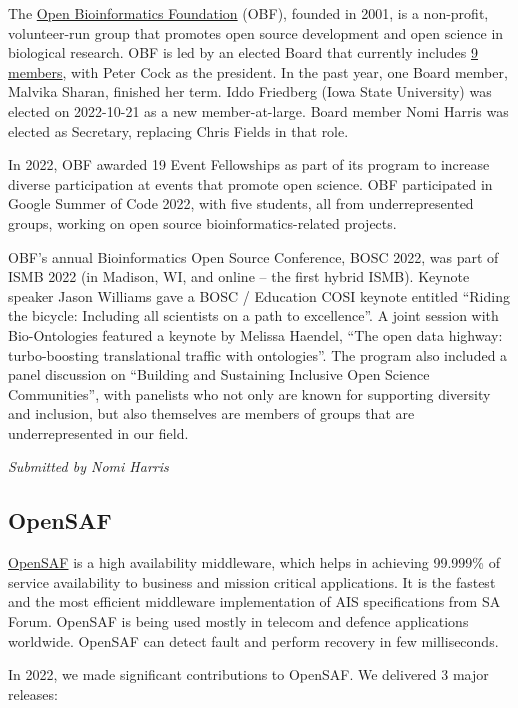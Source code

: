 \documentclass[a4paper]{report}
\begin{document}
The \href{https://www.open-bio.org/}{Open Bioinformatics Foundation} (OBF), founded in 2001, is a non-profit, volunteer-run group that promotes open source development and open science in biological research. OBF is led by an elected Board that currently includes \href{https://open-bio.org/board/}{9 members}, with Peter Cock as the president. In the past year, one Board member, Malvika Sharan, finished her term. Iddo Friedberg (Iowa State University) was elected on 2022-10-21 as a new member-at-large.  Board member Nomi Harris was elected as Secretary, replacing Chris Fields in that role.

In 2022, OBF awarded 19 Event Fellowships as part of its program to increase diverse participation at events that promote open science. OBF participated in Google Summer of Code 2022, with five students, all from underrepresented groups, working on open source bioinformatics-related projects.

OBF's annual Bioinformatics Open Source Conference, BOSC 2022, was part of ISMB 2022 (in Madison, WI, and online – the first hybrid ISMB). Keynote speaker Jason Williams gave a BOSC / Education COSI keynote entitled ``Riding the bicycle: Including all scientists on a path to excellence''. A joint session with Bio-Ontologies featured a keynote by Melissa Haendel, ``The open data highway: turbo-boosting translational traffic with ontologies''. The program also included a panel discussion on ``Building and Sustaining Inclusive Open Science Communities'', with panelists who not only are known for supporting diversity and inclusion, but also themselves are members of groups that are underrepresented in our field.

{\em Submitted by Nomi Harris}

\subsection{OpenSAF}

\href{https://opensaf.sourceforge.io/}{OpenSAF} is a high availability middleware, which helps in achieving 99.999\% of service availability to business and mission critical applications. It is the fastest and the most efficient middleware implementation of AIS specifications from SA Forum. OpenSAF is being used mostly in telecom and defence applications worldwide. OpenSAF can detect fault and perform recovery in few milliseconds.

In 2022, we made significant contributions to OpenSAF. We delivered 3 major releases:
\end{document}
